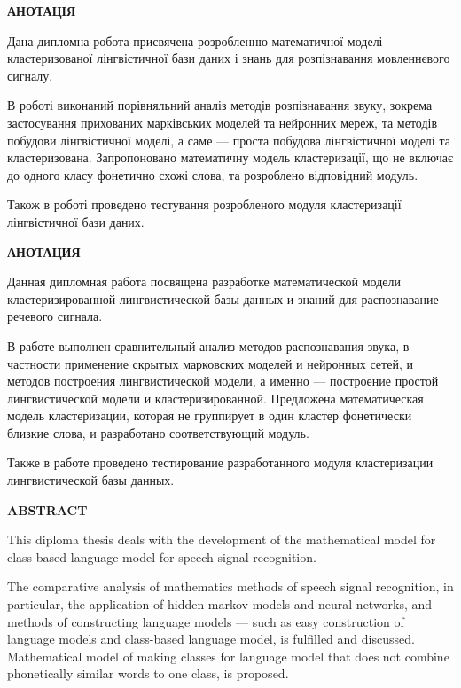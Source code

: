 \documentclass{diploma}
\begin{document}
\renewcommand{\baselinestretch}{1.5}\setfontsize{14pt}
\thispagestyle{empty}
\begin{center}
\textbf{АНОТАЦІЯ}
\end{center}

Дана дипломна робота присвячена розробленню математичної моделі кластеризованої лінгвістичної бази даних і знань для розпізнавання мовленнєвого сигналу.

В роботі виконаний порівняльний аналіз методів розпізнавання звуку, зокрема застосування прихованих марківських моделей та нейронних мереж, та методів побудови лінгвістичної моделі, а саме --- проста побудова лінгвістичної моделі та кластеризована. Запропоновано математичну модель кластеризації, що не включає до одного класу фонетично схожі слова, та розроблено відповідний модуль. 

Також в роботі проведено тестування розробленого модуля кластеризації лінгвістичної бази даних.

\newpage
\thispagestyle{empty}
\begin{center}
\textbf{АНОТАЦИЯ}
\end{center}

Данная дипломная работа посвящена разработке математической модели кластеризированной лингвистической базы данных и знаний для распознавание речевого сигнала.

В работе выполнен сравнительный анализ методов распознавания звука, в частности применение скрытых марковских моделей и нейронных сетей, и методов построения лингвистической модели, а именно --- построение простой лингвистической модели и кластеризированной. Предложена математическая модель кластеризации, которая не группирует в один кластер фонетически близкие слова, и разработано соответствующий модуль.

Также в работе проведено тестирование разработанного модуля кластеризации лингвистической базы данных.
	
\newpage
\thispagestyle{empty}
\begin{center}
\textbf{ABSTRACT}
\end{center}

This diploma thesis deals with the development of the mathematical model for class-based language model for speech signal recognition.
	
The comparative analysis of mathematics methods of speech signal recognition, in particular, the application of hidden markov models and neural networks, and methods of constructing language models --- such as easy construction of language models and class-based language model, is fulfilled and discussed. Mathematical model of making classes for language model that does not combine phonetically similar words to one class, is proposed.
\end{document}
